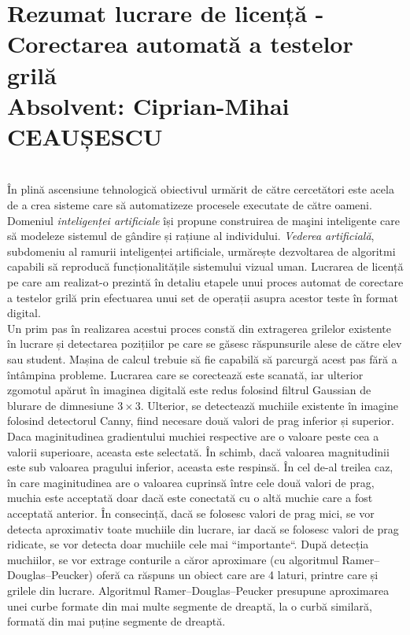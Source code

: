\documentclass[a4paper,12pt]{report}
\newcommand\tab[1][1cm]{\hspace*{#1}}
\begin{document}
\chapter* {Rezumat lucrare de licență - Corectarea automată a testelor grilă \\ Absolvent: Ciprian-Mihai CEAUȘESCU}

\tab \\ \tab În plină ascensiune tehnologică obiectivul urmărit de către cercetători este acela de a crea sisteme care să automatizeze procesele executate de către oameni. Domeniul \textit{inteligenței artificiale} își propune construirea de maşini inteligente care să modeleze sistemul de gândire și rațiune al individului. \textit{Vederea artificială}, subdomeniu al ramurii inteligenței artificiale, urmărește dezvoltarea de algoritmi capabili să reproducă funcționalitățile sistemului vizual uman. Lucrarea de licență pe care am realizat-o prezintă în detaliu etapele unui proces automat de corectare a testelor grilă prin efectuarea unui set de operații asupra acestor teste în format digital. 
\\ \tab Un prim pas în realizarea acestui proces constă din extragerea grilelor existente în lucrare și detectarea pozițiilor pe care se găsesc răspunsurile alese de către elev sau student. Mașina de calcul trebuie să fie capabilă să parcurgă acest pas fără a întâmpina probleme.
Lucrarea care se corectează este scanată, iar ulterior zgomotul apărut în imaginea digitală este redus folosind filtrul Gaussian de blurare de dimnesiune $3 \times 3$. Ulterior, se detectează muchiile existente în imagine folosind detectorul Canny, fiind necesare două valori de prag inferior și superior. Daca maginitudinea gradientului muchiei respective are o valoare peste cea a valorii superioare, aceasta este selectată. În schimb, dacă valoarea magnitudinii este sub valoarea pragului inferior, aceasta este respinsă. În cel de-al treilea caz, în care maginitudinea are o valoarea cuprinsă între cele două valori de prag, muchia este acceptată doar dacă este conectată cu o altă muchie care a fost acceptată anterior. În consecință, dacă se folosesc valori de prag mici, se vor detecta aproximativ toate muchiile din lucrare, iar dacă se folosesc valori de prag ridicate, se vor detecta doar muchiile cele mai ``importante``. După detecția muchiilor, se vor extrage conturile a căror aproximare (cu algoritmul Ramer–Douglas–Peucker) oferă ca răspuns un obiect care are 4 laturi, printre care și grilele din lucrare. Algoritmul Ramer–Douglas–Peucker presupune aproximarea unei curbe formate din mai multe segmente de dreaptă, la o curbă similară, formată din mai puține segmente de dreaptă. 
\end{document}
